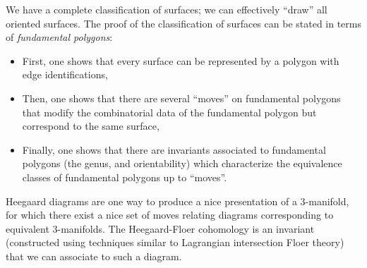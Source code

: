 

We have a complete classification of surfaces; we can effectively ``draw'' all oriented surfaces. The proof of the classification of surfaces can be stated in terms of \emph{fundamental polygons}:
\begin{itemize}
    \item First, one shows that every surface can be represented by a polygon with edge identifications, 
    \item Then, one shows that there are several ``moves'' on fundamental polygons that modify the combinatorial data of the fundamental polygon but correspond to the same surface,
    \item Finally, one shows that there are invariants associated to fundamental polygons (the genus, and orientability) which characterize the equivalence classes of fundamental polygons up to ``moves''.
\end{itemize} 


Heegaard diagrams are one way to produce a nice presentation of a 3-manifold, for which there exist a nice set of moves relating diagrams corresponding to equivalent 3-manifolds. The Heegaard-Floer cohomology is an invariant (constructed using techniques similar to Lagrangian intersection Floer theory) that we can associate to such a diagram.





